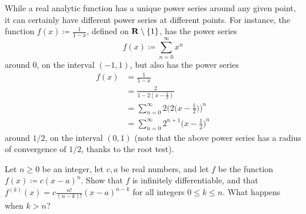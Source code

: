 \begin{remark}\label{4.2.13}
  While a real analytic function has a unique power series around any given point, it can certainly have different power series at different points.
  For instance, the function \(f(x) \coloneqq \frac{1}{1 - x}\), defined on \(\mathbf{R} \setminus \{1\}\), has the power series
  \[
    f(x) \coloneqq \sum_{n = 0}^\infty x^n
  \]
  around \(0\), on the interval \((-1, 1)\), but also has the power series
  \begin{align*}
    f(x) & = \frac{1}{1 - x}                                                  \\
         & = \frac{2}{1 - 2(x - \frac{1}{2})}                                 \\
         & = \sum_{n = 0}^\infty 2 \bigg(2\bigg(x - \frac{1}{2}\bigg)\bigg)^n \\
         & = \sum_{n = 0}^\infty 2^{n + 1} \bigg(x - \frac{1}{2}\bigg)^n
  \end{align*}
  around \(1 / 2\), on the interval \((0, 1)\)
  (note that the above power series has a radius of convergence of \(1 / 2\), thanks to the root test).
\end{remark}

\exercisesection

\begin{exercise}\label{ex 4.2.1}
  Let \(n \geq 0\) be an integer, let \(c, a\) be real numbers, and let \(f\) be the function \(f(x) \coloneqq c (x - a)^n\).
  Show that \(f\) is infinitely differentiable, and that \(f^{(k)}(x) = c \frac{n!}{(n - k)!} (x - a)^{n - k}\) for all integers \(0 \leq k \leq n\).
  What happens when \(k > n\)?
\end{exercise}


